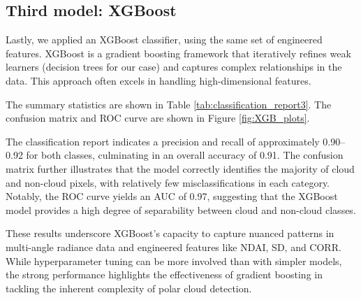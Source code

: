 \documentclass[11pt,letterpaper]{article}
\begin{document}



\vspace{1em} %
\subsection{Third model: XGBoost}
\vspace{0.5em} %

Lastly, we applied an XGBoost classifier, using the same set of engineered features. XGBoost is a gradient boosting framework that iteratively refines weak learners (decision trees for our case) and captures complex relationships in the data. This approach often excels in handling high-dimensional features.

The summary statistics are shown in Table \ref{tab:classification_report3}. The confusion matrix and ROC curve are shown in Figure \ref{fig:XGB_plots}.

The classification report indicates a precision and recall of approximately 0.90–0.92 for both classes, culminating in an overall accuracy of 0.91. The confusion matrix further illustrates that the model correctly identifies the majority of cloud and non-cloud pixels, with relatively few misclassifications in each category. Notably, the ROC curve yields an AUC of 0.97, suggesting that the XGBoost model provides a high degree of separability between cloud and non-cloud classes.

These results underscore XGBoost’s capacity to capture nuanced patterns in multi-angle radiance data and engineered features like NDAI, SD, and CORR. While hyperparameter tuning can be more involved than with simpler models, the strong performance highlights the effectiveness of gradient boosting in tackling the inherent complexity of polar cloud detection.
\end{document}
